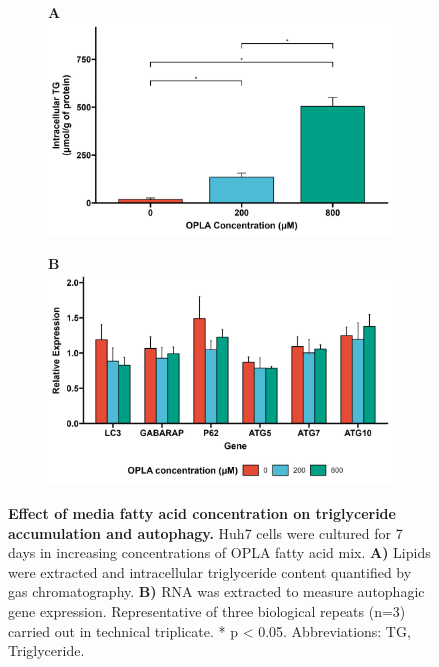 \begin{figure}[h!]
     \begin{subfigure}[b]{0.49\textwidth}
         \textbf{A}
         \centering
         \includegraphics[width=\textwidth]{figures/ch3-Model Development/LFHF TG.png}
     \end{subfigure}  
     \hfill
     \begin{subfigure}[b]{0.49\textwidth}
         \textbf{B}
         \centering
         \includegraphics[width=\textwidth]{figures/ch3-Model Development/LFHF ATG genes.png}
     \end{subfigure}
     \hfill
        \caption{\textbf{Effect of media fatty acid concentration on triglyceride accumulation and autophagy.} Huh7 cells were cultured for 7 days in increasing concentrations of OPLA fatty acid mix. \textbf{A)} Lipids were extracted and intracellular triglyceride content quantified by gas chromatography. \textbf{B)} RNA was extracted to measure autophagic gene expression. Representative of three biological repeats (n=3) carried out in technical triplicate. * p < 0.05. Abbreviations: TG, Triglyceride.}
        \label{fig:ch3-Model Development LFHF}
\end{figure}

